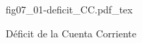 \begin{figure}[h]
\centering
\def\svgwidth{0.5\textwidth}
{fig07_01-deficit_CC.pdf_tex}
\caption{Déficit de la Cuenta Corriente}
\label{fig07_01-deficit_CC}
\end{figure}